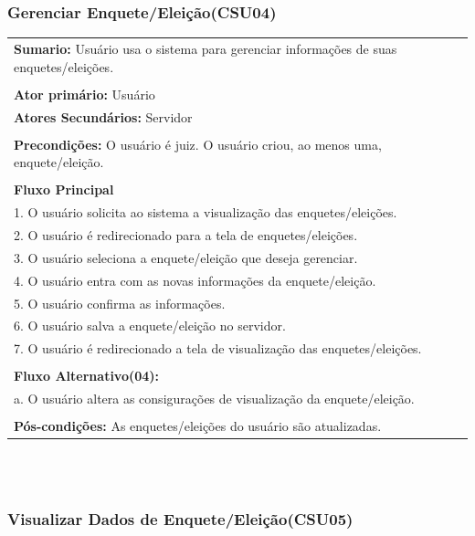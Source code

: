 \documentclass[a4paper,12pt]{article}
\begin{document}
\begin{center}
	{\subsubsection*{Gerenciar Enquete/Eleição(CSU04)}}
\end{center}
\markright{}
\begin{tabular}{|l|}\hline
	{\textbf{Sumario:}} Usuário usa o sistema para gerenciar informações de suas enquetes/eleições.\ \ \ \ \ \ \ \ \ \\\\
	{\textbf{Ator primário:}} Usuário \\
	{\textbf{Atores Secundários:}} Servidor\\\\
	{\textbf{Precondições:}} O usuário é juiz. O usuário criou, ao menos uma, enquete/eleição.\\\\
	{\textbf{Fluxo Principal}}\\
	1. O usuário solicita ao sistema a visualização das enquetes/eleições.\\
	2. O usuário é redirecionado para a tela de enquetes/eleições. \\
	3. O usuário seleciona a enquete/eleição que deseja gerenciar. \\
	4. O usuário entra com as novas informações da enquete/eleição.\\
	5. O usuário confirma as informações.\\
	6. O usuário salva a enquete/eleição no servidor.\\
	7. O usuário é redirecionado a tela de visualização das enquetes/eleições.\\\\
	{\textbf{Fluxo Alternativo(04):}}\\
	a. O usuário altera as consigurações de visualização da enquete/eleição.\\\\
	{\textbf{Pós-condições:}} As enquetes/eleições do usuário são atualizadas.\\
	\hline
\end{tabular}
\\\\
\begin{center}
	{\subsubsection*{Visualizar Dados de Enquete/Eleição(CSU05)}}
\end{center}
\end{document}
